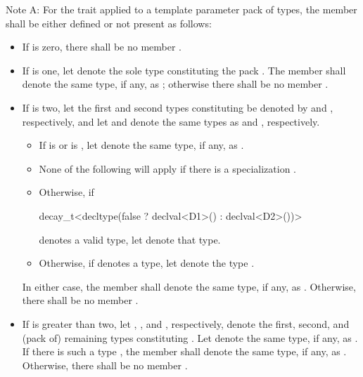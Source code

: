 \pnum
Note A:
For the  trait applied to a template parameter pack  of types,
the member  shall be either defined or not present as follows:
\begin{itemize}
\item If  is zero, there shall be no member .

\item If  is one, let  denote the sole type
constituting the pack .
The member   shall denote the same
type, if any, as ;
otherwise there shall be no member .

\item If  is two,
let the first and second types constituting  be denoted
by  and , respectively, and
let  and  denote
the same types as  and , respectively.
  \begin{itemize}
  \item If  is  or
      is ,
     let  denote the same type, if any,
     as .
  \item
    \begin{note}
      None of the following will apply if there is a specialization
      .
    \end{note}
  \item Otherwise, if
\begin{codeblock}
decay_t<decltype(false ? declval<D1>() : declval<D2>())>
\end{codeblock}
    denotes a valid type, let  denote that type.
  \item Otherwise, if
    denotes a type, let  denote the type
    .
  \end{itemize}
In either case, the member   shall denote
the same type, if any, as .
Otherwise, there shall be no member .

\item If  is greater than two,
let , , and , respectively,
denote the first, second, and (pack of) remaining types constituting .
Let  denote the same type, if any, as .
If there is such a type , the member  
shall denote the same type, if any, as .
Otherwise, there shall be no member .
\end{itemize}

